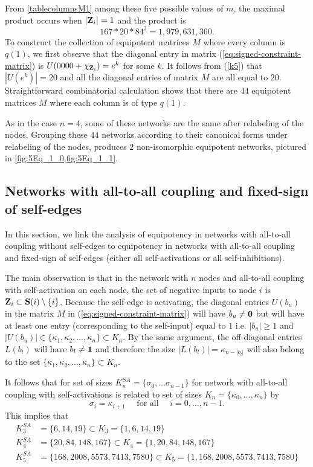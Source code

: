 \documentclass[12pt]{amsart}
\newcommand{\bZ}{{\bf Z}}
\newcommand{\bzero}{{\bf 0}}
\newcommand{\bone}{{\bf 1}}
\newcommand{\Sources}{\mathbf{S}}
\theoremstyle{definition}
\begin{document}
From \cref{tablecolumnsM1} among these five possible values of $m$, the maximal product occurs when $|\bZ_i|=1$ and the product is 
\[ 167*20*84^3 = 1,979,631,360.\] 
To construct the collection of equipotent matrices $M$ where every column is $q(1)$, we first observe that the diagonal entry in matrix (\ref{eq:signed-constraint-matrix}) is $U(0000 + \chi_{\bZ_i}) = e^k$ for some $k$. It follows from (\ref{k5}) that $|U(e^k)| = 20$ and all the diagonal entries of matrix $M$ are all equal to $20$.
 Straightforward combinatorial calculation shows that there are $44$ equipotent matrices $M$ where each column is of type $q(1)$.

As in the case $n=4$, some of these networks are the same after relabeling of the nodes. Grouping these $44$ networks according to their canonical forms under relabeling of the nodes, produces $2$ non-isomorphic equipotent networks, pictured in \cref{fig:5Eq_1_0,fig:5Eq_1_1}.

\subsection{Networks with all-to-all coupling and fixed-sign of self-edges}
In this section, we link the analysis of equipotency in networks with all-to-all coupling without self-edges to equipotency in networks with all-to-all coupling and fixed-sign of self-edges (either all self-activations or all self-inhibitions). 

The main observation is that in the network with $n$ nodes and all-to-all coupling with self-activation on each node, the set of negative inputs to node $i$ is $\bZ_i \subset \Sources(i)\setminus\{i\}$. 
Because the self-edge is activating, the diagonal entries $U(b_u)$ in the matrix $M$ in (\ref{eq:signed-constraint-matrix}) will have $b_u \not = \bzero$ but will have at least one entry (corresponding to the self-input) equal to $1$ i.e. $|b_u|\geq 1$ and $|U(b_u)| \in \{\kappa_1, \kappa_2, \ldots,\kappa_n\} \subset K_n.$
By the same argument, the off-diagonal entries $L(b_l)$ will have $b_l \not = \bone$ and therefore the size
$|L(b_l)| = \kappa_{n - |b_l|}$ will also belong to the set $\{\kappa_1, \kappa_2, \ldots,\kappa_n\} \subset K_n.$

It follows that for set of sizes $K_n^{SA}=\{\sigma_0, \ldots \sigma_{n-1}\}$ for network with all-to-all coupling with self-activations is related to set of sizes $K_{n}=\{\kappa_0, \ldots, \kappa_{n}\}$ by
\[ \sigma_i = \kappa_{i+1} \quad \mbox{ for all }\quad i =0, \ldots, n-1.\]
This implies that
\begin{align*}
    K_{3}^{SA}&=\{6,14,19\} \subset K_3=\{1,6,14,19\}\\ %
    K_{4}^{SA}&=\{20,84, 148, 167\} \subset K_4=\{1,20,84, 148, 167\}\\ %
    K_{5}^{SA}&=\{168,2008,5573,7413,7580\} \subset K_5=\{1,168,2008,5573,7413,7580\}
\end{align*}
\end{document}
